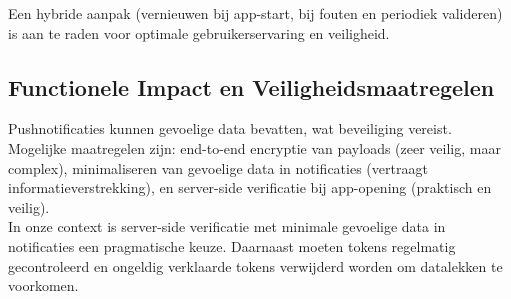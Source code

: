 Een hybride aanpak (vernieuwen bij app-start, bij fouten en periodiek valideren) is aan te raden voor optimale gebruikerservaring en veiligheid.

\subsection{Functionele Impact en Veiligheidsmaatregelen}
Pushnotificaties kunnen gevoelige data bevatten, wat beveiliging vereist. Mogelijke maatregelen zijn: end-to-end encryptie van payloads (zeer veilig, maar complex), minimaliseren van gevoelige data in notificaties (vertraagt informatieverstrekking), en server-side verificatie bij app-opening (praktisch en veilig).\\

In onze context is server-side verificatie met minimale gevoelige data in notificaties een pragmatische keuze. Daarnaast moeten tokens regelmatig gecontroleerd en ongeldig verklaarde tokens verwijderd worden om datalekken te voorkomen.


